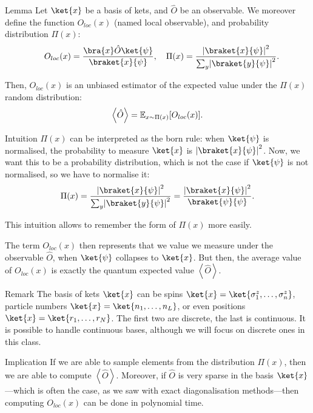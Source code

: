 \documentclass[a4paper]{article}
\begin{document}
\begin{parag}{Lemma}
    Let $\ket{x}$ be a basis of kets, and $\hat{O}$ be an observable. We moreover define the function $O_{loc}\left(x\right)$ (named local observable), and probability distribution $\Pi\left(x\right)$:
    \[\mathspace O_{loc}\left(x\right) = \frac{\bra{x} \hat{O} \ket{\psi}}{\braket{x}{\psi}}, \mathspace \Pi\left(x\right) = \frac{\left|\braket{x}{\psi}\right|^2}{\sum_{y} \left|\braket{y}{\psi}\right|^2}.\]

    Then, $O_{loc}\left(x\right)$ is an unbiased estimator of the expected value under the $\Pi\left(x\right)$ random distribution:
    \[\left\langle \hat{O} \right\rangle = \exval_{x \followsdistr \Pi\left(x\right)}\left[O_{loc}\left(x\right)\right].\]

    \begin{subparag}{Intuition}
        $\Pi\left(x\right)$ can be interpreted as the born rule: when $\ket{\psi}$ is normalised, the probability to measure $\ket{x}$ is $\left|\braket{x}{\psi}\right|^2$. Now, we want this to be a probability distribution, which is not the case if $\ket{\psi}$ is not normalised, so we have to normalise it: 
        \[\Pi\left(x\right) = \frac{\left|\braket{x}{\psi}\right|^2}{\sum_{y} \left|\braket{y}{\psi}\right|^2} = \frac{\left|\braket{x}{\psi}\right|^2}{\braket{\psi}{\psi}}.\]
        
        This intuition allows to remember the form of $\Pi\left(x\right)$ more easily.
        
        The term $O_{loc}\left(x\right)$ then represents that we value we measure under the observable $\hat{O}$, when $\ket{\psi}$ collapses to $\ket{x}$. But then, the average value of $O_{loc}\left(x\right)$ is exactly the quantum expected value $\left\langle \hat{O} \right\rangle$.
    \end{subparag}

    \begin{subparag}{Remark}
        The basis of kets $\ket{x}$ can be spins $\ket{x} = \ket{\sigma_1^z, \ldots, \sigma_n^z}$, particle numbers $\ket{x} = \ket{n_1, \ldots, n_L}$, or even positions $\ket{x} = \ket{r_1, \ldots, r_N}$. The first two are discrete, the last is continuous. It is possible to handle continuous bases, although we will focus on discrete ones in this class.
    \end{subparag}

    \begin{subparag}{Implication}
        If we are able to sample elements from the distribution $\Pi\left(x\right)$, then we are able to compute $\left\langle \hat{O} \right\rangle$. Moreover, if $\hat{O}$ is very sparse in the basis $\ket{x}$---which is often the case, as we saw with exact diagonalisation methods---then computing $O_{loc}\left(x\right)$ can be done in polynomial time.


\end{subparag}
\end{parag}
\end{document}
